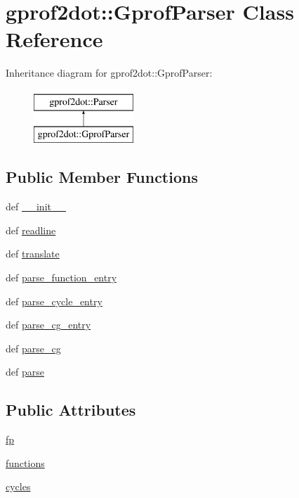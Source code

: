 \hypertarget{classgprof2dot_1_1GprofParser}{
\section{gprof2dot::GprofParser Class Reference}
\label{classgprof2dot_1_1GprofParser}
}
Inheritance diagram for gprof2dot::GprofParser:\begin{figure}[H]
\begin{center}
\leavevmode
\includegraphics[height=2.000000cm]{classgprof2dot_1_1GprofParser}
\end{center}
\end{figure}
\subsection*{Public Member Functions}
\begin{DoxyCompactItemize}
\item 
def \hyperlink{classgprof2dot_1_1GprofParser_acacfb5c014ebdc5b5f0ea25cad4fec6f}{\_\-\_\-init\_\-\_\-}
\item 
def \hyperlink{classgprof2dot_1_1GprofParser_a5ab276c4c9abcc71d917ea14f73511eb}{readline}
\item 
def \hyperlink{classgprof2dot_1_1GprofParser_a2f7fb2ffdfdf923f74f22177baaccc40}{translate}
\item 
def \hyperlink{classgprof2dot_1_1GprofParser_abd32e64d5745ce238a90343bbf7f6bad}{parse\_\-function\_\-entry}
\item 
def \hyperlink{classgprof2dot_1_1GprofParser_a175b0a9f7484eb6f1da3e94a31eaf0ac}{parse\_\-cycle\_\-entry}
\item 
def \hyperlink{classgprof2dot_1_1GprofParser_a95fad2a05c6ca70256d7a25c56aa29cb}{parse\_\-cg\_\-entry}
\item 
def \hyperlink{classgprof2dot_1_1GprofParser_a71d6b6f813e70ca931dacdfc64d0b183}{parse\_\-cg}
\item 
def \hyperlink{classgprof2dot_1_1GprofParser_a840c96752592fffdb69514cf59022705}{parse}
\end{DoxyCompactItemize}
\subsection*{Public Attributes}
\begin{DoxyCompactItemize}
\item 
\hyperlink{classgprof2dot_1_1GprofParser_a65b9a8783fe4aea6e72e67f041c126b2}{fp}
\item 
\hyperlink{classgprof2dot_1_1GprofParser_a7459094ba27540637888860ccea69720}{functions}
\item 
\hyperlink{classgprof2dot_1_1GprofParser_a5a17f96d4420c651af6b955c221c43c9}{cycles}
\end{DoxyCompactItemize}



